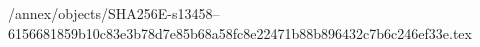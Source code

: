 /annex/objects/SHA256E-s13458--6156681859b10c83e3b78d7e85b68a58fc8e22471b88b896432c7b6c246ef33e.tex
